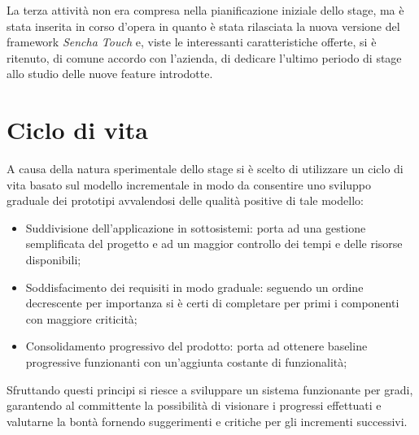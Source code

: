 La terza attività non era compresa nella pianificazione iniziale dello stage, ma è stata inserita in corso d'opera in quanto è stata rilasciata la nuova versione del framework \emph{Sencha Touch} e, viste le interessanti caratteristiche offerte, si è ritenuto, di comune accordo con l'azienda, di dedicare l'ultimo periodo di stage allo studio delle nuove feature introdotte.

\section{Ciclo di vita}
A causa della natura sperimentale dello stage si è scelto di utilizzare un ciclo di vita basato sul modello incrementale in modo da consentire uno sviluppo graduale dei prototipi avvalendosi delle qualità positive di tale modello:
\begin{itemize}
\item Suddivisione dell'applicazione in sottosistemi: porta ad una gestione semplificata del progetto e ad un maggior controllo dei tempi e delle risorse disponibili;
\item Soddisfacimento dei requisiti in modo graduale: seguendo un ordine decrescente per importanza si è certi di completare per primi i componenti con maggiore criticità;
\item Consolidamento progressivo del prodotto: porta ad ottenere baseline progressive funzionanti con un'aggiunta costante di funzionalità;
\end{itemize}
Sfruttando questi principi si riesce a sviluppare un sistema funzionante per gradi, garantendo al committente la possibilità di visionare i progressi effettuati e valutarne la bontà fornendo suggerimenti e critiche per gli incrementi successivi.